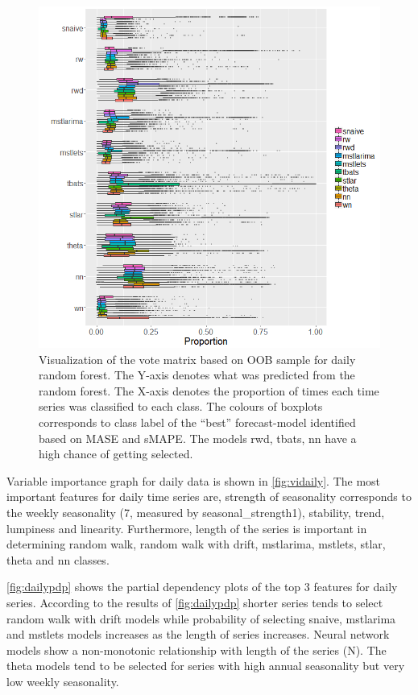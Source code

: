 \documentclass[11pt,a4paper,]{article}
\begin{document}
\begin{figure}
\centering
\includegraphics{figures/oobdaily-1.png}
\caption{\label{fig:oobdaily}Visualization of the vote matrix based on OOB
sample for daily random forest. The Y-axis denotes what was predicted
from the random forest. The X-axis denotes the proportion of times each
time series was classified to each class. The colours of boxplots
corresponds to class label of the ``best'' forecast-model identified
based on MASE and sMAPE. The models rwd, tbats, nn have a high chance of
getting selected.}
\end{figure}

Variable importance graph for daily data is shown in
\autoref{fig:vidaily}. The most important features for daily time series
are, strength of seasonality corresponds to the weekly seasonality (7,
measured by seasonal\_strength1), stability, trend, lumpiness and
linearity. Furthermore, length of the series is important in determining
random walk, random walk with drift, mstlarima, mstlets, stlar, theta
and nn classes.

\autoref{fig:dailypdp} shows the partial dependency plots of the top 3
features for daily series. According to the results of
\autoref{fig:dailypdp} shorter series tends to select random walk with
drift models while probability of selecting snaive, mstlarima and
mstlets models increases as the length of series increases. Neural
network models show a non-monotonic relationship with length of the
series (N). The theta models tend to be selected for series with high
annual seasonality but very low weekly seasonality.
\end{document}
